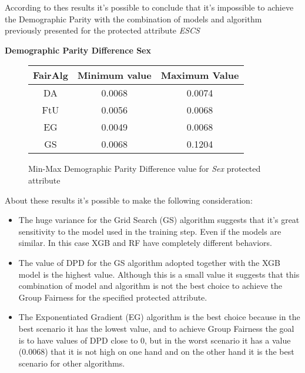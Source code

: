 According to thes results it's possible to conclude that it's impossible to achieve the Demographic Parity with the combination of models and algorithm previously presented for the protected attribute \emph{ESCS}


\newpage
\textbf{Demographic Parity Difference Sex}
\begin{figure}[H]
    \centering
    \begin{tabular}{|c|c|c|}
        \hline
        \textbf{FairAlg} & \textbf{Minimum value} & \textbf{Maximum Value} \\
        \hline
        DA & 0.0068 & 0.0074 \\
        \hline
        FtU & 0.0056 & 0.0068 \\
        \hline
        EG & 0.0049 & 0.0068 \\
        \hline
        GS & 0.0068 & 0.1204 \\
        \hline
    \end{tabular}
    \caption{Min-Max Demographic Parity Difference value for \emph{Sex} protected attribute}
\end{figure}

About these results it's possible to make the following consideration:

\begin{itemize}
    \item The huge variance for the Grid Search (GS) algorithm suggests that it's great sensitivity to the model used in the training step. Even if the models are similar. In this case XGB and RF have completely different behaviors.

    \item The value of DPD for the GS algorithm adopted together with the XGB model is the highest value. Although this is a small value it suggests that this combination of model and algorithm is not the best choice to achieve the Group Fairness for the specified protected attribute.

    \item The Exponentiated Gradient (EG) algorithm is the best choice because in the best scenario it has the lowest value, and to achieve Group Fairness the goal is to have values of DPD close to 0, but in the worst scenario it has a value (0.0068) that it is not high on one hand and on the other hand it is the best scenario for other algorithms.

\end{itemize}


